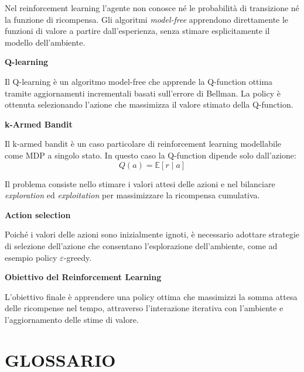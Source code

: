 \documentclass[a4paper,12pt]{report}
\begin{document}
\begin{tcolorbox}[
  colback=green!10!white,
  colframe=green!50!black,
  coltitle=white,
  title=\textbf{Reinforcement Learning – Concetti chiave},
  fonttitle=\bfseries,
  breakable
]
Nel reinforcement learning l’agente non conosce né le probabilità di transizione
né la funzione di ricompensa.
Gli algoritmi \emph{model-free} apprendono direttamente le funzioni di valore
a partire dall’esperienza, senza stimare esplicitamente il modello dell’ambiente.

\medskip
\textbf{Q-learning}

Il Q-learning è un algoritmo model-free che apprende la Q-function ottima
tramite aggiornamenti incrementali basati sull’errore di Bellman.
La policy è ottenuta selezionando l’azione che massimizza il valore stimato
della Q-function.

\medskip
\textbf{k-Armed Bandit}

Il k-armed bandit è un caso particolare di reinforcement learning
modellabile come MDP a singolo stato.
In questo caso la Q-function dipende solo dall’azione:
\[
Q(a) = \mathbb{E}[r \mid a]
\]

Il problema consiste nello stimare i valori attesi delle azioni e nel bilanciare
\emph{exploration} ed \emph{exploitation} per massimizzare la ricompensa cumulativa.

\medskip
\textbf{Action selection}

Poiché i valori delle azioni sono inizialmente ignoti, è necessario adottare
strategie di selezione dell’azione che consentano l’esplorazione dell’ambiente,
come ad esempio policy $\varepsilon$-greedy.

\medskip
\textbf{Obiettivo del Reinforcement Learning}

L’obiettivo finale è apprendere una policy ottima che massimizzi la somma
attesa delle ricompense nel tempo, attraverso l’interazione iterativa
con l’ambiente e l’aggiornamento delle stime di valore.

\end{tcolorbox}

\newpage
\section*{GLOSSARIO}
\end{document}
